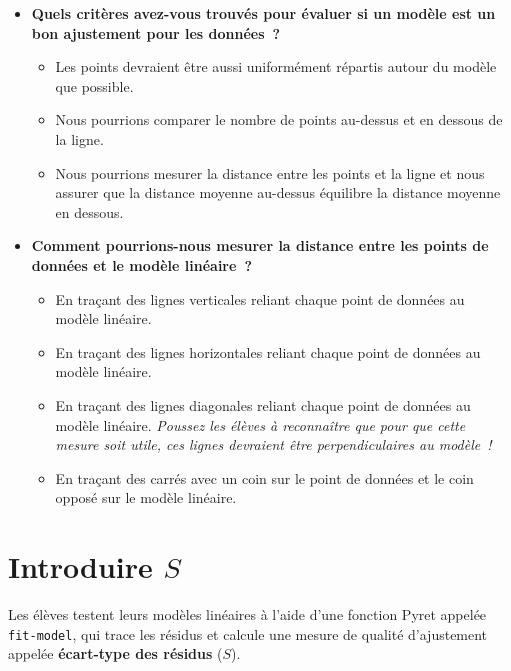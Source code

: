\documentclass[12pt,a4paper]{article}
\begin{document}
\begin{thinkbox}
  \begin{itemize}
    \item \textbf{Quels critères avez-vous trouvés pour évaluer si un modèle est un bon ajustement pour les données~?}
    \begin{itemize}
      \item Les points devraient être aussi uniformément répartis autour du modèle que possible.
      \item Nous pourrions comparer le nombre de points au-dessus et en dessous de la ligne.
      \item Nous pourrions mesurer la distance entre les points et la ligne et nous assurer que la distance moyenne au-dessus équilibre la distance moyenne en dessous.
    \end{itemize}
    \item \textbf{Comment pourrions-nous mesurer la distance entre les points de données et le modèle linéaire~?}
    \begin{itemize}
      \item En traçant des lignes verticales reliant chaque point de données au modèle linéaire.
      \item En traçant des lignes horizontales reliant chaque point de données au modèle linéaire.
      \item En traçant des lignes diagonales reliant chaque point de données au modèle linéaire. \emph{Poussez les élèves à reconnaître que pour que cette mesure soit utile, ces lignes devraient être perpendiculaires au modèle~!}
      \item En traçant des carrés avec un coin sur le point de données et le coin opposé sur le modèle linéaire.
    \end{itemize}
  \end{itemize}
\end{thinkbox}

\newpage

\section{Introduire \texorpdfstring{$S$}{S}}

\begin{overviewbox}
  Les élèves testent leurs modèles linéaires à l'aide d'une fonction Pyret appelée \texttt{fit-model}, qui trace les résidus et calcule une mesure de qualité d'ajustement appelée \textbf{écart-type des résidus} ($S$).
\end{overviewbox}
\end{document}
